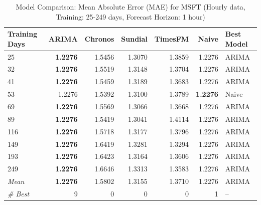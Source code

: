 \begin{table}[htbp]
\centering
\caption{Model Comparison: Mean Absolute Error (MAE) for MSFT (Hourly data, Training: 25-249 days, Forecast Horizon: 1 hour)}
\label{tab:comparison_MSFT_1h_train-less-year-log_h1_MAE}
\small
\begin{tabular}{lrrrrrl}
\toprule
Training Days & ARIMA & Chronos & Sundial & TimesFM & Naive & Best Model \\
\midrule
25 & \textbf{1.2276} & 1.5456 & 1.3070 & 1.3859 & 1.2276 & ARIMA \\
32 & \textbf{1.2276} & 1.5519 & 1.3148 & 1.3704 & 1.2276 & ARIMA \\
41 & \textbf{1.2276} & 1.5459 & 1.3189 & 1.3683 & 1.2276 & ARIMA \\
53 & 1.2276 & 1.5392 & 1.3100 & 1.3789 & \textbf{1.2276} & Naive \\
69 & \textbf{1.2276} & 1.5569 & 1.3066 & 1.3668 & 1.2276 & ARIMA \\
89 & \textbf{1.2276} & 1.5419 & 1.3041 & 1.4114 & 1.2276 & ARIMA \\
116 & \textbf{1.2276} & 1.5718 & 1.3177 & 1.3796 & 1.2276 & ARIMA \\
149 & \textbf{1.2276} & 1.6419 & 1.3281 & 1.3294 & 1.2276 & ARIMA \\
193 & \textbf{1.2276} & 1.6423 & 1.3164 & 1.3606 & 1.2276 & ARIMA \\
249 & \textbf{1.2276} & 1.6646 & 1.3313 & 1.3583 & 1.2276 & ARIMA \\
\midrule
\textit{Mean} & \textbf{1.2276} & 1.5802 & 1.3155 & 1.3710 & 1.2276 & ARIMA \\
\textit{\# Best} & 9 & 0 & 0 & 0 & 1 & -- \\
\bottomrule
\end{tabular}
\end{table}